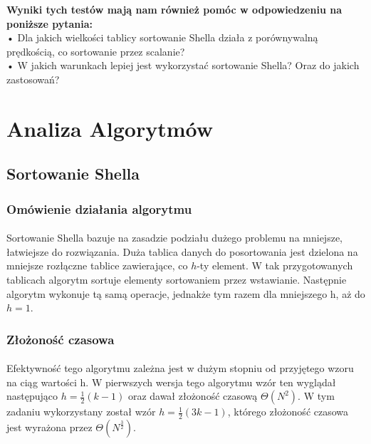 \documentclass{article}
\begin{document}
\textbf{Wyniki tych testów mają nam również pomóc w odpowiedzeniu na poniższe pytania:}\\
•	Dla jakich wielkości tablicy sortowanie Shella działa z porównywalną prędkością, co sortowanie przez scalanie?\\
•	W jakich warunkach lepiej jest wykorzystać sortowanie Shella? Oraz do jakich zastosowań?

\break
\section{Analiza Algorytmów}

\subsection{Sortowanie Shella}

\subsubsection{Omówienie działania algorytmu}
\paragraph{} Sortowanie Shella bazuje na zasadzie podziału dużego problemu na mniejsze, łatwiejsze do rozwiązania. Duża tablica danych do posortowania jest dzielona na mniejsze rozłączne tablice zawierające, co ${h}$-ty element. W tak przygotowanych tablicach algorytm sortuje elementy sortowaniem przez wstawianie. Następnie algorytm wykonuje tą samą operacje, jednakże tym razem dla mniejszego h, aż do ${h = 1}$.

\subsubsection{Złożoność czasowa}
\paragraph{}Efektywność tego algorytmu zależna jest w dużym stopniu od przyjętego wzoru na ciąg wartości h. W pierwszych wersja tego algorytmu wzór ten wyglądał następująco ${h = \frac{1}{2}(k-1)}$ oraz dawał złożoność czasową ${\Theta(N^2 )}$.
W tym zadaniu wykorzystany został wzór ${h = \frac{1}{2}(3k-1)}$, którego złożoność czasowa jest wyrażona przez ${\Theta(N^\frac{3}{2})}$.
\end{document}
